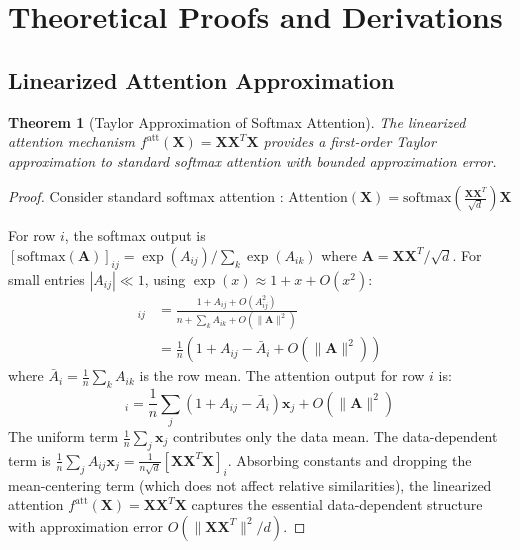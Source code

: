 \documentclass{article}
\theoremstyle{plain}
\newtheorem{theorem}{Theorem}[section]
\theoremstyle{definition}
\theoremstyle{remark}
\begin{document}
\newpage
\section{Theoretical Proofs and Derivations}
\label{app:proofs}

\subsection{Linearized Attention Approximation}

\begin{theorem}[Taylor Approximation of Softmax Attention]
The linearized attention mechanism $f^{\text{att}}(\mathbf{X}) = \mathbf{X}\mathbf{X}^T\mathbf{X}$ provides a first-order Taylor approximation to standard softmax attention with bounded approximation error.
\end{theorem}

\begin{proof}
Consider standard softmax attention \citep{vaswani2017attention}:
$\text{Attention}(\mathbf{X}) = \text{softmax}\left(\frac{\mathbf{X}\mathbf{X}^T}{\sqrt{d}}\right) \mathbf{X}$

For row $i$, the softmax output is $[\text{softmax}(\mathbf{A})]_{ij} = \exp(A_{ij})/\sum_k \exp(A_{ik})$ where $\mathbf{A} = \mathbf{X}\mathbf{X}^T/\sqrt{d}$. For small entries $|A_{ij}| \ll 1$, using $\exp(x) \approx 1 + x + O(x^2)$:
\begin{align}
[\text{softmax}(\mathbf{A})]_{ij} &= \frac{1 + A_{ij} + O(A_{ij}^2)}{n + \sum_k A_{ik} + O(\|\mathbf{A}\|^2)} \nonumber \\
&= \frac{1}{n}\left(1 + A_{ij} - \bar{A}_i + O(\|\mathbf{A}\|^2)\right)
\end{align}
where $\bar{A}_i = \frac{1}{n}\sum_k A_{ik}$ is the row mean. The attention output for row $i$ is:
\begin{equation}
[\text{Attention}(\mathbf{X})]_i = \frac{1}{n}\sum_j (1 + A_{ij} - \bar{A}_i)\mathbf{x}_j + O(\|\mathbf{A}\|^2)
\end{equation}
The uniform term $\frac{1}{n}\sum_j \mathbf{x}_j$ contributes only the data mean. The data-dependent term is $\frac{1}{n}\sum_j A_{ij}\mathbf{x}_j = \frac{1}{n\sqrt{d}}[\mathbf{X}\mathbf{X}^T\mathbf{X}]_i$. Absorbing constants and dropping the mean-centering term (which does not affect relative similarities), the linearized attention $f^{\text{att}}(\mathbf{X}) = \mathbf{X}\mathbf{X}^T\mathbf{X}$ captures the essential data-dependent structure with approximation error $O(\|\mathbf{X}\mathbf{X}^T\|^2/d)$.
\end{proof}
\end{document}
